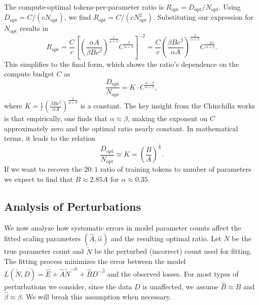 The compute-optimal tokens-per-parameter ratio is $R_{\text{opt}} = D_{\text{opt}} / N_{\text{opt}}$. Using $D_{\text{opt}} = C / (c N_{\text{opt}})$, we find $R_{\text{opt}} = C / (c N_{\text{opt}}^2)$. Substituting our expression for $N_{\text{opt}}$ results in 
\begin{equation}
    R_{\text{opt}} = \frac{C}{c} \left[ \left( \frac{\alpha A}{\beta B c^\beta} \right)^{\frac{1}{\alpha+\beta}} C^{\frac{\beta}{\alpha+\beta}} \right]^{-2} = \frac{C}{c} \left( \frac{\beta B c^\beta}{\alpha A} \right)^{\frac{2}{\alpha+\beta}} C^{\frac{-2\beta}{\alpha+\beta}}.
\end{equation}
This simplifies to the final form, which shows the ratio's dependence on the compute budget $C$ as
\begin{equation}
    \frac{D_{\text{opt}}}{N_{\text{opt}}} = K \cdot C^{\frac{\alpha-\beta}{\alpha+\beta}},
    \label{eq:ratio}
\end{equation}
where $K = \frac{1}{c} \left( \frac{\beta B c^\beta}{\alpha A} \right)^{\frac{2}{\alpha+\beta}}$ is a constant. The key insight from the Chinchilla works is that empirically, one finds that $\alpha \approx \beta$, making the exponent on $C$ approximately zero and the optimal ratio nearly constant. In mathematical terms, it leads to the relation
\begin{equation}
    \frac{D_{\text{opt}}}{N_{\text{opt}}} \approx K =
    \left( \frac{ B }{ A} \right)^{\frac{1}{\alpha}}.
    \label{eq:empirical_ratio}
\end{equation}
If we want to recover the $20:1$ ratio of training tokens to number of parameters we expect to find that $B \approx 2.85 A$ for $\alpha \approx 0.35$.

\subsection{Analysis of Perturbations}
We now analyze how systematic errors in model parameter counts affect the fitted scaling parameters $(\hat{A}, \hat{\alpha})$ and the resulting optimal ratio. Let $N$ be the true parameter count and $\tilde{N}$ be the perturbed (incorrect) count used for fitting. The fitting process minimizes the error between the model $L(\tilde{N}, D) = \hat{E} + \hat{A}\tilde{N}^{-\hat{\alpha}} + \hat{B}D^{-\hat{\beta}}$ and the observed losses. For most types of perturbations we consider, since the data $D$ is unaffected, we assume $\hat{B} \approx B$ and $\hat{\beta} \approx \beta$. We will break this assumption when necessary.

